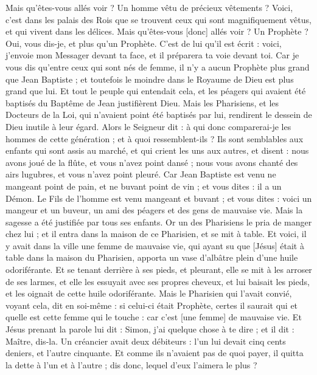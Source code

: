 \begin{multicols}{2}
Mais qu'êtes-vous allés voir ? Un homme vêtu de précieux vêtements ? Voici, c'est dans les palais des Rois que se trouvent ceux qui sont magnifiquement vêtus, et qui vivent dans les délices.
Mais qu'êtes-vous [donc] allés voir ? Un Prophète ? Oui, vous dis-je, et plus qu'un Prophète.
C'est de lui qu'il est écrit : voici, j'envoie mon Messager devant ta face, et il préparera ta voie devant toi.
Car je vous dis qu'entre ceux qui sont nés de femme, il n'y a aucun Prophète plus grand que Jean Baptiste ; et toutefois le moindre dans le Royaume de Dieu est plus grand que lui.
Et tout le peuple qui entendait cela, et les péagers qui avaient été baptisés du Baptême de Jean justifièrent Dieu.
Mais les Pharisiens, et les Docteurs de la Loi, qui n'avaient point été baptisés par lui, rendirent le dessein de Dieu inutile à leur égard.
Alors le Seigneur dit : à qui donc comparerai-je les hommes de cette génération ; et à quoi ressemblent-ils ?
Ils sont semblables aux enfants qui sont assis au marché, et qui crient les uns aux autres, et disent : nous avons joué de la flûte, et vous n'avez point dansé ; nous vous avons chanté des airs lugubres, et vous n'avez point pleuré.
Car Jean Baptiste est venu ne mangeant point de pain, et ne buvant point de vin ; et vous dites : il a un Démon.
Le Fils de l'homme est venu mangeant et buvant ; et vous dites : voici un mangeur et un buveur, un ami des péagers et des gens de mauvaise vie.
Mais la sagesse a été justifiée par tous ses enfants.
Or un des Pharisiens le pria de manger chez lui ; et il entra dans la maison de ce Pharisien, et se mit à table.
Et voici, il y avait dans la ville une femme de mauvaise vie, qui ayant su que [Jésus] était à table dans la maison du Pharisien, apporta un vase d'albâtre plein d'une huile odoriférante.
Et se tenant derrière à ses pieds, et pleurant, elle se mit à les arroser de ses larmes, et elle les essuyait avec ses propres cheveux, et lui baisait les pieds, et les oignait de cette huile odoriférante.
Mais le Pharisien qui l'avait convié, voyant cela, dit en soi-même : si celui-ci était Prophète, certes il saurait qui et quelle est cette femme qui le touche : car c'est [une femme] de mauvaise vie.
Et Jésus prenant la parole lui dit : Simon, j'ai quelque chose à te dire ; et il dit : Maître, dis-la.
Un créancier avait deux débiteurs : l'un lui devait cinq cents deniers, et l'autre cinquante.
Et comme ils n'avaient pas de quoi payer, il quitta la dette à l'un et à l'autre ; dis donc, lequel d'eux l'aimera le plus ?

\end{multicols}
